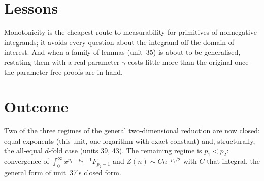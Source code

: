 \documentclass[11pt]{article}
\begin{document}
\section{Lessons}
Monotonicity is the cheapest route to measurability for primitives of nonnegative integrands; it
avoids every question about the integrand off the domain of interest. And when a family of lemmas
(unit~35) is about to be generalised, restating them with a real parameter $\gamma$ costs little more
than the original once the parameter-free proofs are in hand.

\section{Outcome}
Two of the three regimes of the general two-dimensional reduction are now closed: equal exponents
(this unit, one logarithm with exact constant) and, structurally, the all-equal $d$-fold case (units
39, 43). The remaining regime is $p_1<p_2$: convergence of $\int_0^\infty x^{p_1-p_2-1}F_{p_2-1}$ and
$Z(n)\sim Cn^{-p_1/2}$ with $C$ that integral, the general form of unit~37's closed form.
\end{document}

